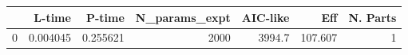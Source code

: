 \begin{tabular}{lrrrrrr}
\toprule
{} &    L-time &    P-time &  N\_params\_expt &  AIC-like &      Eff &  N. Parts \\
\midrule
0 &  0.004045 &  0.255621 &           2000 &    3994.7 &  107.607 &         1 \\
\bottomrule
\end{tabular}
